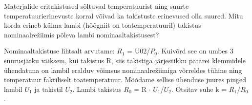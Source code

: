 
Materjalide eritakistused sõltuvad temperatuurist ning suurte temperatuurierinevuste korral võivad ka takistuste erinevused olla suured. Mitu korda erineb külma lambi (hõõgniit on toatemperatuuril) takistus nominaalrežiimis põleva lambi nominaaltakistusest?

\hint

\solu
Nominaaltakistuse lihtsalt arvutame: $R_1$ = U02/$P_0$. Kuivõrd see on umbes 3 suurusjärku väiksem, kui takistus R, siis takistiga järjestikku patarei klemmidele ühendatuna on lambil eralduv võimsus nominaalrežiimiga võrreldes tühine ning temperatuur faktiliselt toatemperatuur. Mõõdame sellise ühenduse juures pinged lambil $U_1$ ja takistil $U_2$. Lambi takistus $R_0$ = R $\cdot$ $U_1$/$U_2$. Otsitav suhe k = $R_1$/$R_0$.
\probend
